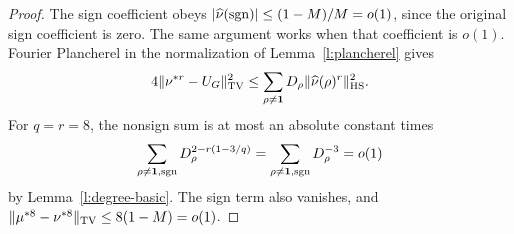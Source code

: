\begin{proof}
The sign coefficient obeys
$|\widehat\nu(\operatorname{sgn})|\le(1-M)/M=o(1)$, since the original sign
coefficient is zero. The same argument works when that coefficient is $o(1)$.  Fourier Plancherel in the normalization of
Lemma~\ref{l:plancherel} gives
\[
 4\|\nu^{*r}-U_G\|_{\mathrm{TV}}^2
 \le\sum_{\rho\ne\mathbf1}D_\rho
                    \|\widehat\nu(\rho)^r\|_{\mathrm{HS}}^2.
\]
For $q=r=8$, the nonsign sum is at most an absolute constant times
\[
 \sum_{\rho\ne\mathbf1,\operatorname{sgn}}
           D_\rho^{2-r(1-3/q)}
 =\sum_{\rho\ne\mathbf1,\operatorname{sgn}}D_\rho^{-3}=o(1)
\]
by Lemma~\ref{l:degree-basic}.  The sign term also vanishes, and
$\|\mu^{*8}-\nu^{*8}\|_{\mathrm{TV}}\le8(1-M)=o(1)$.
\end{proof}
